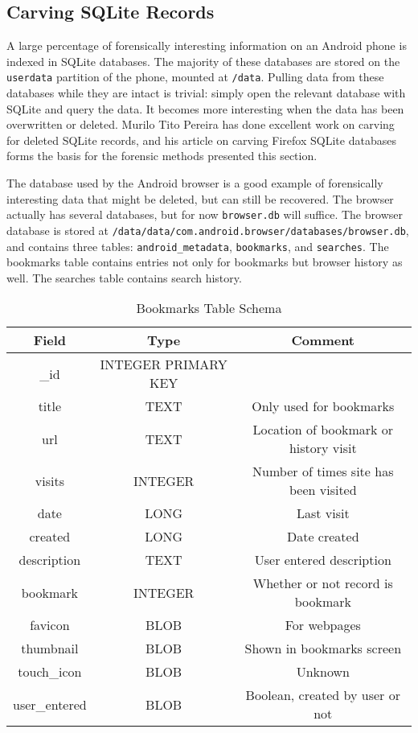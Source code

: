 \subsection{Carving SQLite Records} A large percentage of forensically interesting information on an Android phone is
indexed in SQLite databases.  The majority of these databases are stored on the \texttt{userdata} partition of the phone, mounted at
\texttt{/data}.  Pulling data from these databases while they are intact is trivial: simply open the relevant database with SQLite
and query the data.  It becomes more interesting when the data has been overwritten or deleted.  Murilo Tito Pereira has done
excellent work on carving for deleted SQLite records, and his article on carving Firefox SQLite databases forms the basis for the
forensic methods presented this section.  \cite{carvefirefox}

The database used by the Android browser is a good example of forensically interesting data that might be deleted, but can still be
recovered. The browser actually has several databases, but for now \texttt{browser.db} will suffice. The browser database is stored
at \texttt{/data/data/com.android.browser/databases/browser.db}, and contains three tables: \texttt{android\_metadata},
\texttt{bookmarks}, and \texttt{searches}.  The bookmarks table contains entries not only for bookmarks but browser history as well.
The searches table contains search history. 

\begin{table}[htb]
\begin {center}
	\begin{tabular}{| c | c | c |}
	\hline
	Field & Type & Comment \\
	\hline
	\_id & INTEGER PRIMARY KEY & \\
	title & TEXT  &  Only used for bookmarks \\
	url & TEXT  & Location of bookmark or history visit \\
	visits & INTEGER  & Number of times site has been visited \\
	date & LONG  &  Last visit \\
	created & LONG &  Date created \\
	description & TEXT &  User entered description \\
	bookmark & INTEGER & Whether or not record is bookmark \\
	favicon & BLOB &  For webpages \\
	thumbnail & BLOB &  Shown in bookmarks screen \\
	touch\_icon & BLOB &  Unknown \\
	user\_entered & BLOB & Boolean, created by user or not \\
	\hline
	\end{tabular}
\end{center}
	\caption{Bookmarks Table Schema}
	\label{tab:bookmarkschema}
\end{table}

